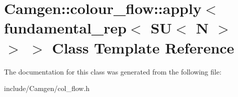 \hypertarget{a00016}{\section{Camgen\-:\-:colour\-\_\-flow\-:\-:apply$<$ fundamental\-\_\-rep$<$ S\-U$<$ N $>$ $>$ $>$ Class Template Reference}
\label{a00016}
}


The documentation for this class was generated from the following file\-:\begin{DoxyCompactItemize}
\item 
include/\-Camgen/col\-\_\-flow.\-h\end{DoxyCompactItemize}
